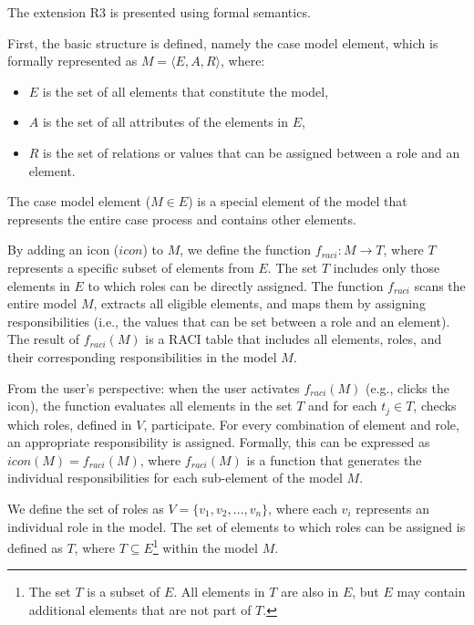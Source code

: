 \documentclass{article}
\begin{document}
The extension R3 is presented using formal semantics.

First, the basic structure is defined, namely the case model element, which is formally represented as \( M = \langle E, A, R \rangle \), where:
\begin{itemize}
    \item \( E \) is the set of all elements that constitute the model,
    \item \( A \) is the set of all attributes of the elements in \( E \),
    \item \( R \) is the set of relations or values that can be assigned between a role and an element.
\end{itemize}

The case model element (\( M \in E \)) is a special element of the model that represents the entire case process and contains other elements.

By adding an icon (\( icon \)) to \( M \), we define the function \( f_{raci} : M \rightarrow T \), where \( T \) represents a specific subset of elements from \( E \). The set \( T \) includes only those elements in \( E \) to which roles can be directly assigned. The function \( f_{raci} \) scans the entire model \( M \), extracts all eligible elements, and maps them by assigning responsibilities (i.e., the values that can be set between a role and an element). The result of \( f_{raci}(M) \) is a RACI table that includes all elements, roles, and their corresponding responsibilities in the model \( M \). 

From the user’s perspective: when the user activates \( f_{raci}(M) \) (e.g., clicks the icon), the function evaluates all elements in the set \( T \) and for each \( t_j \in T \), checks which roles, defined in \( V \), participate. For every combination of element and role, an appropriate responsibility is assigned. Formally, this can be expressed as \( icon(M) = f_{raci}(M) \), where \( f_{raci}(M) \) is a function that generates the individual responsibilities for each sub-element of the model \( M \).

We define the set of roles as \( V = \{ v_1, v_2, \ldots, v_n \} \), where each \( v_i \) represents an individual role in the model. The set of elements to which roles can be assigned is defined as \( T \), where \( T \subseteq E \)\footnote{The set \( T \) is a subset of \( E \). All elements in \( T \) are also in \( E \), but \( E \) may contain additional elements that are not part of \( T \).} within the model \( M \).
\end{document}
